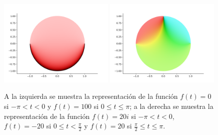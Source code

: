 \begin{figure}[h]
    \centering
    \includegraphics[width=0.49\textwidth]{../Aplicacion/atrozos.png}
    \hfil
    \includegraphics[width=0.49\textwidth]{../Aplicacion/atrozos(2).png}
\caption{A la izquierda se muestra la representación de la función $f(t) = 0$ si $- \pi < t < 0$ y $f(t) = 100$ si $0 \leq t \leq \pi$; a la derecha se muestra la representación de la función $f(t) = 20i$ si $- \pi < t < 0$, $f(t) = -20$ si $0 \leq t < \frac{\pi}{2}$ y $f(t) = 20$ si $\frac{\pi}{2} \leq t \leq \pi$.}
    \label{fig:atrozos}
\end{figure}

